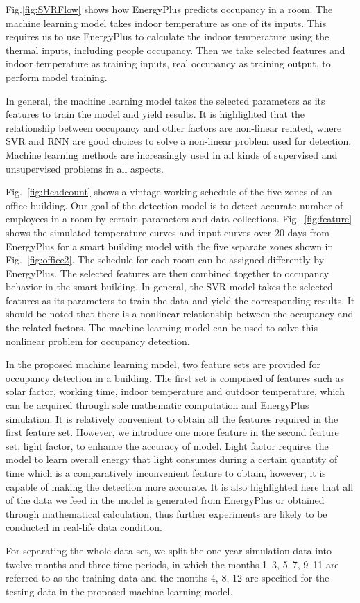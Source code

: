 Fig.\ref{fig:SVRFlow} shows how EnergyPlus predicts occupancy in a room. The
machine learning model takes indoor temperature as one of its inputs. This
requires us to use EnergyPlus to calculate the indoor temperature using the
thermal inputs, including people occupancy. Then we take selected features and
indoor temperature as training inputs, real occupancy as training output, to
perform model training.

In general, the machine learning model takes the selected parameters
as its features to train the model and yield results. It is highlighted
that the relationship between occupancy and other factors are
non-linear related, where SVR and RNN are good choices to
solve a non-linear problem used for detection. Machine learning methods are
increasingly used in all kinds of supervised and unsupervised problems
in all aspects.

Fig.~\ref{fig:Headcount} shows a vintage working schedule of the five
zones of an office building. Our goal of the detection model is to
detect accurate number of employees in a room by certain parameters
and data collections. Fig.~\ref{fig:feature} shows the simulated
temperature curves and input curves over 20 days from EnergyPlus for a
smart building model with the five separate zones shown in
Fig.~\ref{fig:office2}. The schedule for each room can be assigned
differently by EnergyPlus. The selected features are then combined
together to occupancy behavior in the smart building. In general, the
SVR model takes the selected features as its parameters to train the
data and yield the corresponding results. It should be noted that
there is a nonlinear relationship between the occupancy and the
related factors. The machine learning model can be used to solve this
nonlinear problem for occupancy detection.

In the proposed machine learning model, two feature sets
are provided for occupancy detection in a building. The first set is comprised
of features such as solar factor, working time, indoor temperature and outdoor
temperature, which can be acquired through sole mathematic computation and
EnergyPlus simulation. It is relatively convenient to obtain all the features
required in the first feature set. However, we introduce one more feature in
the second feature set, light factor, to enhance the accuracy of model. Light
factor requires the model to learn overall energy that light consumes during a
certain quantity of time which is a comparatively inconvenient feature to
obtain, however, it is capable of making the detection more accurate. It is
also highlighted here that all of the data we feed in the model is generated
from EnergyPlus or obtained through mathematical calculation, thus further
experiments are likely to be conducted in real-life data condition.

For separating the whole data set, we split the one-year simulation
data into twelve months and three time periods, in which the months
1--3, 5--7, 9--11 are referred to as the training data and the months 4,
8, 12 are specified for the testing data in the proposed machine
learning model.
